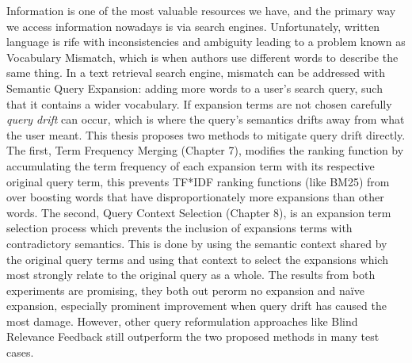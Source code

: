     







    

Information is one of the most valuable resources we have, and the primary way we access information nowadays is via search engines. Unfortunately, written language is rife with inconsistencies and ambiguity leading to a problem known as Vocabulary Mismatch, which is when authors use different words to describe the same thing. In a text retrieval search engine, mismatch can be addressed with Semantic Query Expansion: adding more words to a user's search query, such that it contains a wider vocabulary. If expansion terms are not chosen carefully \textit{query drift} can occur, which is where the query's semantics drifts away from what the user meant. This thesis proposes two methods to mitigate query drift directly. The first, Term Frequency Merging (Chapter 7), modifies the ranking function by accumulating the term frequency of each expansion term with its respective original query term, this prevents TF*IDF ranking functions (like BM25) from over boosting words that have disproportionately more expansions than other words. The second, Query Context Selection (Chapter 8), is an expansion term selection process which prevents the inclusion of expansions terms with contradictory semantics. This is done by using the semantic context shared by the original query terms and using that context to select the expansions which most strongly relate to the original query as a whole. The results from both experiments are promising, they both out perorm no expansion and na{\"i}ve expansion, especially prominent improvement when query drift has caused the most damage. However, other query reformulation approaches like Blind Relevance Feedback still outperform the two proposed methods in many test cases.